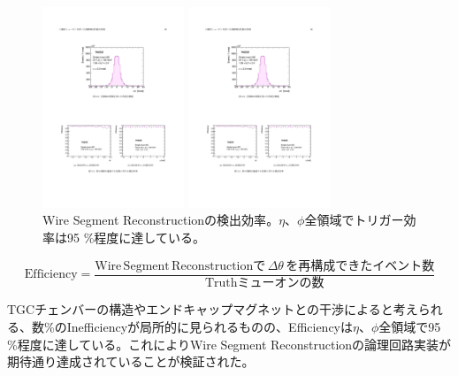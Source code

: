 \begin{figure}
    \begin{minipage}[b]{.5\linewidth}
    \centering
    \includegraphics[height=6cm]{fig/Test/Vivado_Wire_eta.pdf}
    \end{minipage}%
    \begin{minipage}[b]{.5\linewidth}
    \centering
    \includegraphics[height=6cm]{fig/Test/Vivado_Wire_phi.pdf}
    \end{minipage}%
    \caption[Wire Segment Reconstructionの検出効率]{Wire Segment Reconstructionの検出効率\cite{mt_nabeyama}。$\eta$、$\phi$全領域でトリガー効率は95 \%程度に達している。}
    \label{Vivado_Wire_Efficiency}
    \end{figure}
    
    \begin{equation}
    \mathrm{Efficiency} = \frac{\mathrm{Wire \,Segment \,Reconstructionで}\,\Delta\theta\,\mathrm{を再構成できたイベント数}}{\mathrm{Truth ミューオン の数}}
\end{equation}

TGCチェンバーの構造やエンドキャップマグネットとの干渉によると考えられる、数\%のInefficiencyが局所的に見られるものの、Efficiencyは$\eta$、$\phi$全領域で95 \%程度に達している。これによりWire Segment Reconstructionの論理回路実装が期待通り達成されていることが検証された。

